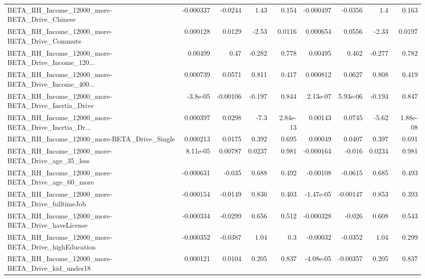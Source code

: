 \begin{tabular}{lrrrrrrrr}
BETA\_RH\_Income\_12000\_more-BETA\_Drive\_Chinese       &   -0.000337 &      -0.0244 &     1.43 &    0.154 &  -0.000497 &     -0.0356 &          1.4 &         0.163 \\
BETA\_RH\_Income\_12000\_more-BETA\_Drive\_Commute       &    0.000128 &       0.0129 &    -2.53 &   0.0116 &   0.000654 &      0.0556 &        -2.33 &        0.0197 \\
BETA\_RH\_Income\_12000\_more-BETA\_Drive\_Income\_120... &     0.00499 &         0.47 &   -0.282 &    0.778 &    0.00495 &       0.462 &       -0.277 &         0.782 \\
BETA\_RH\_Income\_12000\_more-BETA\_Drive\_Income\_400... &    0.000739 &       0.0571 &    0.811 &    0.417 &   0.000812 &      0.0627 &        0.808 &         0.419 \\
BETA\_RH\_Income\_12000\_more-BETA\_Drive\_Inertia\_Drive &    -3.8e-05 &     -0.00106 &   -0.197 &    0.844 &   2.13e-07 &    5.93e-06 &       -0.193 &         0.847 \\
BETA\_RH\_Income\_12000\_more-BETA\_Drive\_Inertia\_Dr... &    0.000397 &       0.0298 &     -7.3 & 2.84e-13 &    0.00143 &      0.0745 &        -5.62 &      1.88e-08 \\
BETA\_RH\_Income\_12000\_more-BETA\_Drive\_Single        &    0.000213 &       0.0175 &    0.392 &    0.695 &    0.00049 &      0.0407 &        0.397 &         0.691 \\
BETA\_RH\_Income\_12000\_more-BETA\_Drive\_age\_35\_less   &    8.11e-05 &      0.00787 &   0.0237 &    0.981 &  -0.000164 &      -0.016 &       0.0234 &         0.981 \\
BETA\_RH\_Income\_12000\_more-BETA\_Drive\_age\_60\_more   &   -0.000631 &       -0.035 &    0.688 &    0.492 &   -0.00108 &     -0.0615 &        0.685 &         0.493 \\
BETA\_RH\_Income\_12000\_more-BETA\_Drive\_fulltimeJob   &   -0.000154 &      -0.0149 &    0.836 &    0.403 &  -1.47e-05 &    -0.00147 &        0.853 &         0.393 \\
BETA\_RH\_Income\_12000\_more-BETA\_Drive\_haveLicense   &   -0.000334 &      -0.0299 &    0.656 &    0.512 &  -0.000328 &      -0.026 &        0.608 &         0.543 \\
BETA\_RH\_Income\_12000\_more-BETA\_Drive\_highEducation &   -0.000352 &      -0.0387 &     1.04 &      0.3 &   -0.00032 &     -0.0352 &         1.04 &         0.299 \\
BETA\_RH\_Income\_12000\_more-BETA\_Drive\_kid\_under18   &    0.000121 &       0.0104 &    0.205 &    0.837 &  -4.08e-05 &    -0.00357 &        0.205 &         0.837 \\

\end{tabular}

